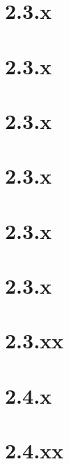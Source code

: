 \documentclass[11pt]{article}
\begin{document}
\section{2.3.x}
\section{2.3.x}
\section{2.3.x}
\section{2.3.x}
\section{2.3.x}
\section{2.3.x}

\section{2.3.xx}

\section{2.4.x}

\section{2.4.xx}
\end{document}
